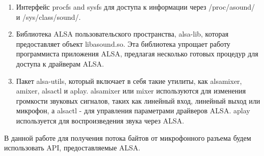 \begin{enumerate}
\item Интерфейс procfs and sysfs для доступа к информации через /proc/asound/ и /sys/class/sound/.
 
\item Библиотека ALSA пользовательского пространства, alsa-lib, которая предоставляет объект libasound.so. Эта библиотека упрощает работу программиста приложения ALSA, предлагая несколько готовых процедур для доступа к драйверам ALSA.

\item Пакет alsa-utils, который включает в себя такие утилиты, как alsamixer, amixer, alsactl и aplay. alsamixer или mixer используются для изменения громкости звуковых сигналов, таких как линейный вход, линейный выход или микрофон, а alsactl - для управления параметрами драйверов ALSA. aplay используется для воспроизведения звука через ALSA.
\end{enumerate}

В данной работе для получения потока байтов от микрофонного разъема будем использовать API, предоставляемые ALSA.
